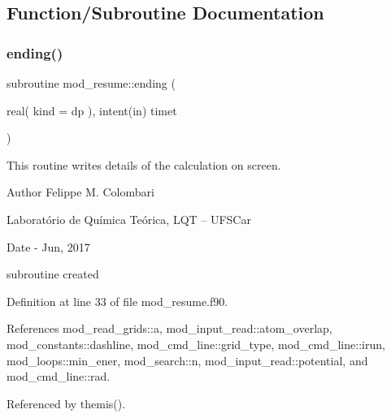 \subsection{Function/\+Subroutine Documentation}
\mbox{\label{namespacemod__resume_a74e0ed44fafff381d91477160c6d8a74}} 
\subsubsection{\texorpdfstring{ending()}{ending()}}
{\footnotesize\ttfamily subroutine mod\+\_\+resume\+::ending (\begin{DoxyParamCaption}\item[{real( kind = dp ), intent(in)}]{timet }\end{DoxyParamCaption})}



This routine writes details of the calculation on screen. 

\begin{DoxyAuthor}{Author}
Felippe M. Colombari
\begin{DoxyItemize}
\item Laboratório de Química Teórica, L\+QT -- U\+F\+S\+Car 
\end{DoxyItemize}
\end{DoxyAuthor}
\begin{DoxyDate}{Date}
-\/ Jun, 2017
\begin{DoxyItemize}
\item subroutine created 
\end{DoxyItemize}
\end{DoxyDate}


Definition at line 33 of file mod\+\_\+resume.\+f90.



References mod\+\_\+read\+\_\+grids\+::a, mod\+\_\+input\+\_\+read\+::atom\+\_\+overlap, mod\+\_\+constants\+::dashline, mod\+\_\+cmd\+\_\+line\+::grid\+\_\+type, mod\+\_\+cmd\+\_\+line\+::irun, mod\+\_\+loops\+::min\+\_\+ener, mod\+\_\+search\+::n, mod\+\_\+input\+\_\+read\+::potential, and mod\+\_\+cmd\+\_\+line\+::rad.



Referenced by themis().

\mbox{\label{namespacemod__resume_a36133bfde88e19b38e5d5245c89843fe}} 

